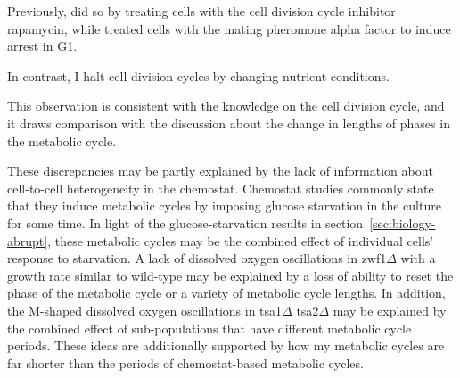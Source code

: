 Previously, \textcite{baumgartnerFlavinbasedMetabolicCycles2018} did so by treating cells with the cell division cycle inhibitor rapamycin, while \textcite{papagiannakisAutonomousMetabolicOscillations2017} treated cells with the mating pheromone alpha factor to induce arrest in G1.

In contrast, I halt cell division cycles by changing nutrient conditions.

This observation is consistent with the knowledge on the cell division cycle, %
and it draws comparison with the discussion about the change in lengths of phases in the metabolic cycle. %

These discrepancies may be partly explained by the lack of information about cell-to-cell heterogeneity in the chemostat.
Chemostat studies commonly state that they induce metabolic cycles by imposing glucose starvation in the culture for some time.
In light of the glucose-starvation results in section~\ref{sec:biology-abrupt}, these metabolic cycles may be the combined effect of individual cells' response to starvation.
A lack of dissolved oxygen oscillations in zwf1$\Delta$ with a growth rate similar to wild-type \parencite{tuCyclicChangesMetabolic2007} may be explained by a loss of ability to reset the phase of the metabolic cycle or a variety of metabolic cycle lengths.
In addition, the M-shaped dissolved oxygen oscillations in tsa1$\Delta$ tsa2$\Delta$ may be explained by the combined effect of sub-populations that have different metabolic cycle periods.
These ideas are additionally supported by how my metabolic cycles are far shorter than the periods of chemostat-based metabolic cycles.



